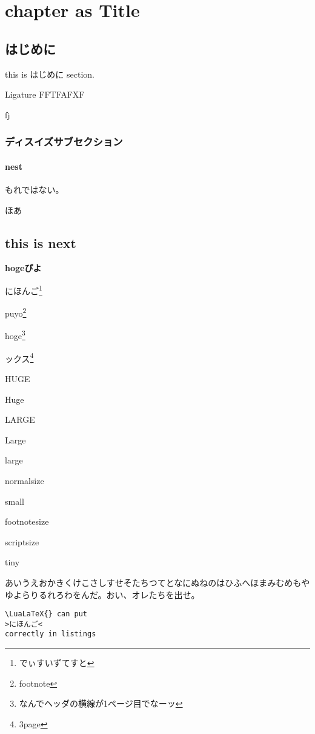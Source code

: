 \documentclass{word-lua}
\author{WORD太郎}
\subtitle{subtitleだぴょんhoge}
\begin{document}
\chapter{chapter as Title}

\section{はじめに}
this is はじめに section.

Ligature FFTFAFXF

fj

\subsection{ディスイズサブセクション}

\subsubsection{nest}
もれではない。

{\textsf{ほあ}}

\section{this is next}

{\bf hogeぴよ}

にほんご\footnote{でぃすいずてすと}

puyo\footnote{footnote}

hoge\footnote{なんでヘッダの横線が1ページ目でなーッ}

ックス\footnote{3page}

{\HUGE HUGE}

{\Huge Huge}

{\LARGE LARGE}

{\Large Large}

{\large large}

{\normalsize normalsize}

{\small small}

{\footnotesize footnotesize}

{\scriptsize scriptsize}

{\tiny tiny}

あいうえおかきくけこさしすせそたちつてとなにぬねのはひふへほまみむめもやゆよらりるれろわをんだ。おい、オレたちを出せ。

\begin{lstlisting}
\LuaLaTeX{} can put
>にほんご<
correctly in listings
\end{lstlisting}
\end{document}
